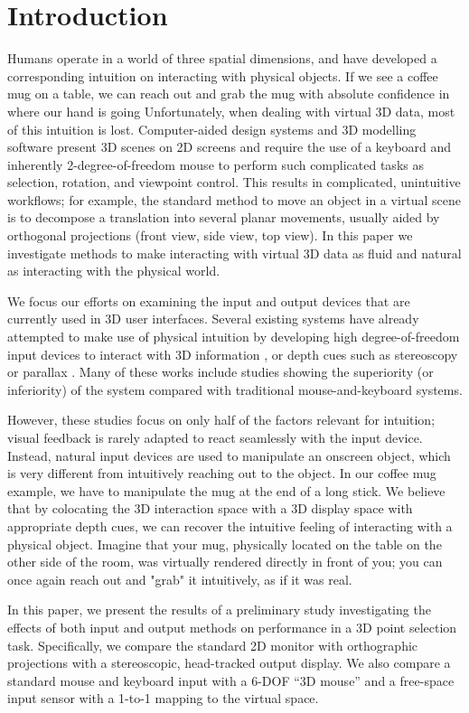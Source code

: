 \section{Introduction}\label{sec:intro}
Humans operate in a world of three spatial dimensions, and have developed a
corresponding intuition on interacting with physical objects.
If we see a coffee mug on a table, we can reach out and grab the mug with
absolute confidence in where our hand is going
Unfortunately, when dealing with virtual 3D data, most of this intuition is
lost. Computer-aided design systems and 3D modelling software present 3D scenes
on 2D screens and require the use of a keyboard and inherently
2-degree-of-freedom mouse to perform such complicated tasks as selection,
rotation, and viewpoint control. This results in complicated, unintuitive
workflows; for example, the standard method to move an object in a virtual scene
is to decompose a translation into several planar movements, usually aided by
orthogonal projections (front view, side view, top view). In this paper we
investigate methods to make interacting with virtual 3D data as fluid and
natural as interacting with the physical world.

We focus our efforts on examining the input and output devices that are
currently used in 3D user interfaces. Several existing systems have already
attempted to make use of physical intuition by developing high degree-of-freedom
input devices to interact with 3D information \cite{manders2010gesture,
mattheiss2011navigating,mine1997moving}, or depth cues such as
stereoscopy or parallax \cite{boritz1997study, schultheis2012comparison}.
Many of these works include studies showing the superiority (or inferiority)
of the system compared with traditional mouse-and-keyboard systems.

However, these studies focus on only half of the factors relevant for intuition;
visual feedback is rarely adapted to react seamlessly with the input device.
Instead, natural input devices are used to manipulate an onscreen object, which
is very different from intuitively reaching out to the object. In our coffee
mug example, we have to manipulate the mug at the end of a long stick. We
believe that by colocating the 3D interaction space with a 3D display space
with appropriate depth cues, we can recover the intuitive feeling of interacting
with a physical object. Imagine that your mug, physically located on the table
on the other side of the room, was virtually rendered directly in front of you;
you can once again reach out and "grab" it intuitively, as if it was real.

In this paper, we present the results of a preliminary study investigating the
effects of both input and output methods on performance in a 3D point selection
task. Specifically, we compare the standard 2D monitor with orthographic
projections with a stereoscopic, head-tracked output display. We also compare a
standard mouse and keyboard input with a 6-DOF ``3D mouse'' and a free-space
input sensor with a 1-to-1 mapping to the virtual space.


